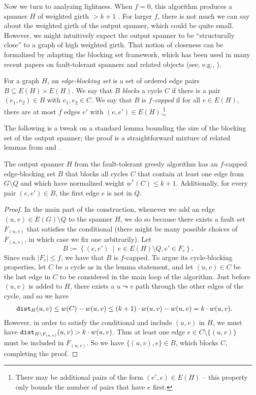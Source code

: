 Now we turn to analyzing lightness.
When $f=0$, this algorithm produces a spanner $H$ of weighted girth $>k+1$ \cite{ENS14}.
For larger $f$, there is not much we can say about the weighted girth of the output spanner, which could be quite small.
However, we might intuitively expect the output spanner to be ``structurally close'' to a graph of high weighted girth.
That notion of closeness can be formalized by adapting the blocking set framework, which has been used in many recent papers on fault-tolerant spanners and related objects (see, e.g., \cite{BP19, DR20, BDR21, BDR22,BDN22,BDN23, PST24, BHP24}).


\begin{definition} 
For a graph $H$, an \emph{edge-blocking set} is a set of ordered edge pairs $B \subseteq E(H) \times E(H)$.
We say that $B$ \emph{blocks} a cycle $C$ if there is a pair $(e_1, e_2) \in B$ with $e_1, e_2 \in C$.
We say that $B$ is \emph{$f$-capped} if for all $e \in E(H)$, there are at most $f$ edges $e'$ with $(e, e') \in E(H)$.\footnote{There may be additional pairs of the form $(e', e) \in E(H)$ -- this property only bounds the number of pairs that have $e$ first.}
\end{definition}

The following is a tweak on a standard lemma bounding the size of the blocking set of the output spanner; the proof is a straightforward mixture of related lemmas from \cite{BP19} and \cite{ENS14}.

\begin{lemma} \label{lem:bsetexists}
The output spanner $H$ from the fault-tolerant greedy algorithm has an $f$-capped edge-blocking set $B$ that blocks all cycles $C$ that contain at least one edge from $G \setminus Q$ and which have normalized weight $w^*(C) \le k+1$.
Additionally, for every pair $(e, e') \in B$, the first edge $e$ is not in $Q$.
\end{lemma}
\begin{proof}
In the main part of the construction, whenever we add an edge $(u, v) \in E(G) \setminus Q$ to the spanner $H$, we do so because there exists a fault set $F_{(u, v)}$ that satisfies the conditional (there might be many possible choices of $F_{(u, v)}$, in which case we fix one arbitrarily).
Let
$$B := \left\{ (e, e') \ \mid \ e \in E(H) \setminus Q, e' \in F_e\right\}.$$
Since each $|F_e| \le f$, we have that $B$ is $f$-capped.
To argue its cycle-blocking properties, let $C$ be a cycle as in the lemma statement, and let $(u, v) \in C$ be the last edge in $C$ to be considered in the main loop of the algorithm.
Just before $(u, v)$ is added to $H$, there exists a $u \leadsto v$ path through the other edges of the cycle, and so we have
\begin{align*}
\texttt{dist}_H(u, v) &\le w(C) - w(u, v) \le (k+1) \cdot w(u, v) - w(u, v) = k \cdot w(u, v).
\end{align*}
However, in order to satisfy the conditional and include $(u, v)$ in $H$, we must have
$\texttt{dist}_{H \setminus F_{(u, v)}}(u, v) > k \cdot w(u, v)$.
Thus at least one edge $e \in C \setminus \{(u, v)\}$ must be included in $F_{(u, v)}$.
So we have $\{(u, v), e\} \in B$, which blocks $C$, completing the proof.
\end{proof}


